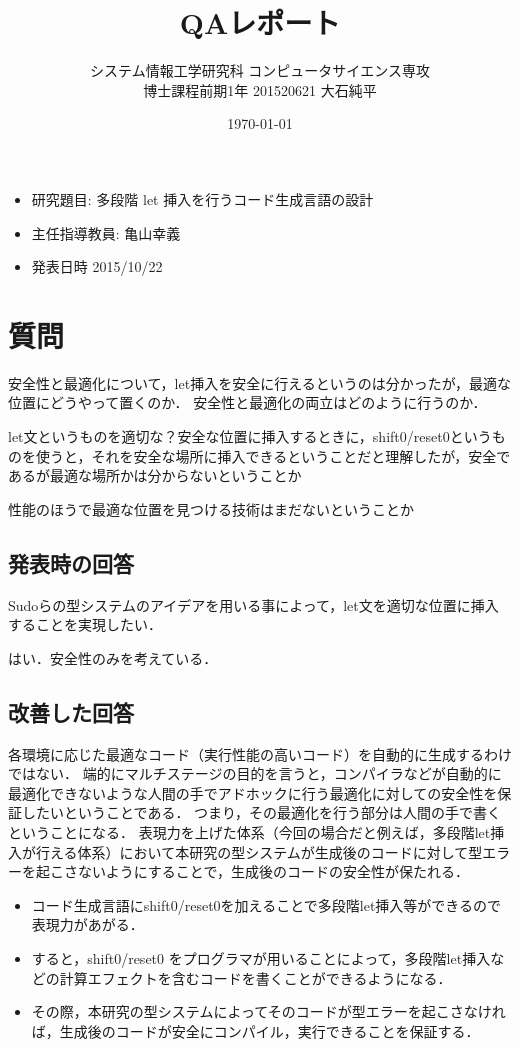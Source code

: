 \documentclass[10pt,a4j,xcolor=dvipsnames,twocolumn]{jarticle}
\title {\vspace{-2.0cm}QAレポート}
\date{\today}
\author{システム情報工学研究科 コンピュータサイエンス専攻 \\
  博士課程前期1年 201520621 大石純平 \\
}
\theoremstyle{definition}
\begin{document}
\maketitle

\begin{itemize}
\item 研究題目: 多段階 let 挿入を行うコード生成言語の設計
\item 主任指導教員: 亀山幸義
\item 発表日時 2015/10/22
\end{itemize}

\section{質問}
\label{sec:1}
安全性と最適化について，let挿入を安全に行えるというのは分かったが，最適な位置にどうやって置くのか．
安全性と最適化の両立はどのように行うのか．

let文というものを適切な？安全な位置に挿入するときに，shift0/reset0というものを使うと，それを安全な場所に挿入できるということだと理解したが，安全であるが最適な場所かは分からないということか

性能のほうで最適な位置を見つける技術はまだないということか

\subsection{発表時の回答}
Sudoらの型システムのアイデア\cite{Sudo2014}を用いる事によって，let文を適切な位置に挿入することを実現したい．

はい．安全性のみを考えている．

\subsection{改善した回答}
各環境に応じた最適なコード（実行性能の高いコード）を自動的に生成するわけではない．
端的にマルチステージの目的を言うと，コンパイラなどが自動的に最適化できないような人間の手でアドホックに行う最適化に対しての安全性を保証したいということである．
つまり，その最適化を行う部分は人間の手で書くということになる．
表現力を上げた体系（今回の場合だと例えば，多段階let挿入が行える体系）において本研究の型システムが生成後のコードに対して型エラーを起こさないようにすることで，生成後のコードの安全性が保たれる．

\begin{itemize}
\item コード生成言語にshift0/reset0\cite{Materzok2011}を加えることで多段階let挿入等ができるので表現力があがる．
\item すると，shift0/reset0 をプログラマが用いることによって，多段階let挿入などの計算エフェクトを含むコードを書くことができるようになる．
\item その際，本研究の型システムによってそのコードが型エラーを起こさなければ，生成後のコードが安全にコンパイル，実行できることを保証する．
\end{itemize}
\end{document}
